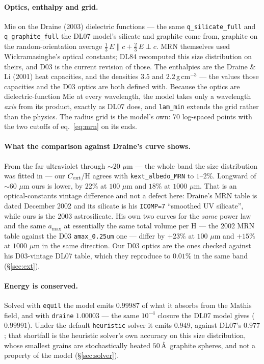 \documentclass{my_memo}
\newcommand{\code}[1]{\texttt{#1}}
\newcommand{\um}{\ensuremath{\,\mu\mathrm{m}}}
\begin{document}
\paragraph{Optics, enthalpy and grid.} Mie on the Draine (2003) dielectric
functions --- the same \code{q\_silicate\_full} and \code{q\_graphite\_full}
the DL07 model's silicate and graphite come from, graphite on the
random-orientation average $\tfrac13\,E\!\parallel\!c + \tfrac23\,E\!\perp\!c$.
MRN themselves used Wickramasinghe's optical constants; DL84 recomputed this
size distribution on theirs, and D03 is the current revision of those. The
enthalpies are the Draine \& Li (2001) heat capacities, and the densities
$3.5$ and $2.2$\,g\,cm$^{-3}$ --- the values those capacities and the D03
optics are both defined with. Because the optics are dielectric-function Mie at
every wavelength, the model takes only a wavelength \emph{axis} from its
product, exactly as DL07 does, and \code{lam\_min} extends the grid rather
than the physics. The radius grid is the model's own: 70 log-spaced points with
the two cutoffs of eq.~\eqref{eq:mrn} on its ends.

\paragraph{What the comparison against Draine's curve shows.} From the far
ultraviolet through $\sim20\,\um$ --- the whole band the size distribution was
fitted in --- our $C_{\rm ext}$/H agrees with \code{kext\_albedo\_MRN} to
$1$--$2\%$. Longward of $\sim60\,\um$ ours is lower, by $22\%$ at
$100\,\um$ and $18\%$ at $1000\,\um$. That is an optical-constants vintage
difference and not a defect here: Draine's MRN table is dated December 2002 and
its silicate is his \code{ICOMP=7} ``smoothed UV silicate'', while ours is the
2003 astrosilicate. His own two curves for the \emph{same} power law and the
same $a_{\max}$ at essentially the same total volume per H --- the 2002 MRN
table against the D03 \code{amax\_0.25um} one --- differ by $+23\%$ at
$100\,\um$ and $+15\%$ at $1000\,\um$ in the same direction. Our D03 optics
are the ones checked against his D03-vintage DL07 table, which they reproduce
to $0.01\%$ in the same band (\S\ref{sec:ext}).

\paragraph{Energy is conserved.} Solved with \code{equil} the model emits
$0.99987$ of what it absorbs from the Mathis field, and with \code{draine}
$1.00003$ --- the same $10^{-4}$ closure the DL07 model gives ($0.99991$).
Under the default \code{heuristic} solver it emits $0.949$, against DL07's
$0.977$; that shortfall is the heuristic solver's own accuracy on this size
distribution, whose smallest grains are stochastically heated $50$\,\AA\
graphite spheres, and not a property of the model
(\S\ref{sec:solver}).
\end{document}
